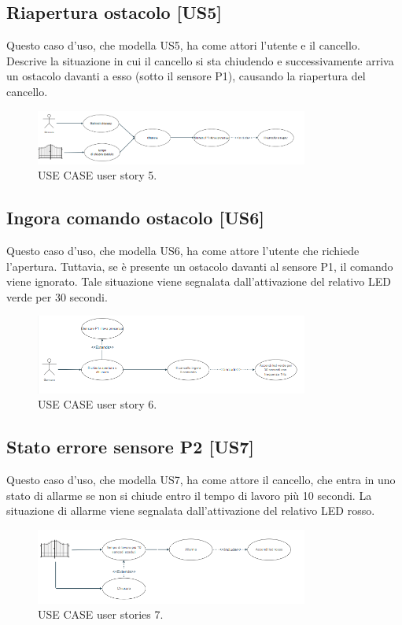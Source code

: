 \documentclass[12pt]{article}
\begin{document}
\subsection{Riapertura ostacolo [US5]}
Questo caso d'uso, che modella US5, ha come attori l'utente e il cancello. Descrive la situazione in cui il cancello si sta chiudendo e successivamente arriva un ostacolo davanti a esso (sotto il sensore P1), causando la riapertura del cancello.
    \begin{figure}[H]
        \centering
        \includegraphics[width=0.8\textwidth]{use_case_us5.PNG}
        \caption{USE CASE user story 5.}
        \label{fig:use_case_us5}
    \end{figure}
\newpage
\subsection{Ingora comando ostacolo [US6]}
Questo caso d'uso, che modella US6, ha come attore l'utente che richiede l'apertura. Tuttavia, se è presente un ostacolo davanti al sensore P1, il comando viene ignorato. Tale situazione viene segnalata dall'attivazione del relativo LED verde per 30 secondi.
    \begin{figure}[h]
        \centering
        \includegraphics[width=0.8\textwidth]{use_case_us6.PNG}
        \caption{USE CASE user story 6.}
        \label{fig:use_case_us6}
    \end{figure}

\subsection{Stato errore sensore P2 [US7]}
Questo caso d'uso, che modella US7, ha come attore il cancello, che entra in uno stato di allarme se non si chiude entro il tempo di lavoro più 10 secondi. La situazione di allarme viene segnalata dall'attivazione del relativo LED rosso.
\begin{figure}[H]
    \centering
    \includegraphics[width=0.8\textwidth]{use_case_us7.PNG}
    \caption{USE CASE user stories 7.}
    \label{fig:use_case_us7}
\end{figure}
\end{document}
